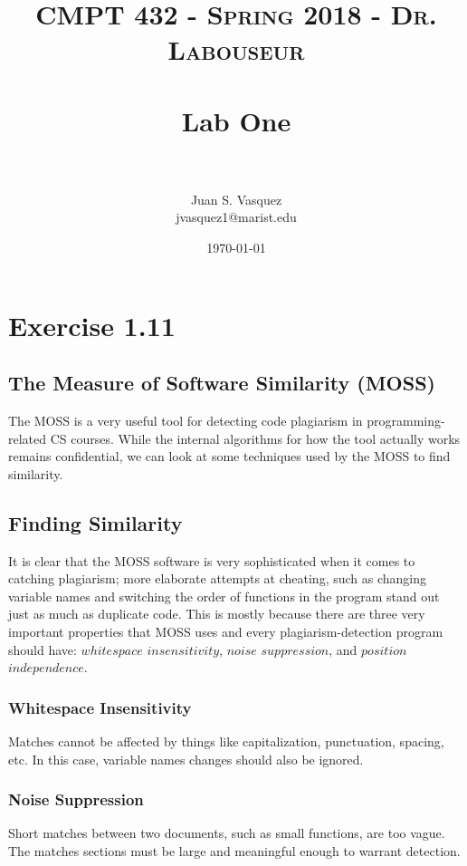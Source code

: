 \documentclass[letterpaper, 10pt,DIV=13]{scrartcl}
\title{	
   \normalfont \normalsize 
   \textsc{CMPT 432 - Spring 2018 - Dr. Labouseur} \\[10pt] %
   \horrule{0.5pt} \\[0.25cm] 	%
   \huge Lab One  \\     	    %
   \horrule{0.5pt} \\[0.25cm] 	%
}
\author{Juan S. Vasquez \\ \normalsize jvasquez1@marist.edu}
\date{\normalsize\today} 	%
\numberwithin{equation}{section} %
\numberwithin{figure}{section} %
\numberwithin{table}{section} %
\begin{document}
\maketitle %

\section{Exercise 1.11}

\subsection{The Measure of Software Similarity (MOSS)}
The MOSS is a very useful tool for detecting code plagiarism in programming-related CS courses. While the internal algorithms for how the tool actually works remains confidential, we can look at some techniques used by the MOSS to find similarity.

\subsection{Finding Similarity}
It is clear that the MOSS software is very sophisticated when it comes to catching plagiarism; more elaborate attempts at cheating, such as changing variable names and switching the order of functions in the program stand out just as much as duplicate code. This is mostly because there are three very important properties that MOSS uses and every plagiarism-detection program should have: $whitespace$ $insensitivity$, $noise$ $suppression$, and $position$ $independence$.

\subsubsection{Whitespace Insensitivity}
Matches cannot be affected by things like capitalization, punctuation, spacing, etc. In this case, variable names changes should also be ignored.

\subsubsection{Noise Suppression}
Short matches between two documents, such as small functions, are too vague. The matches sections must be large and meaningful enough to warrant detection.
\end{document}
